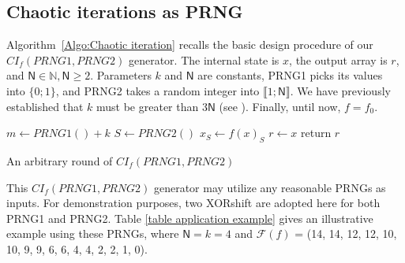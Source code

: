 \documentclass[conference]{IEEEtran}
\begin{document}
\subsection{Chaotic iterations as PRNG}
\label{subsec Chaotic iterations as PRNG}





Algorithm~\ref{Algo:Chaotic iteration} recalls the basic design procedure of our $CI_f(PRNG1,PRNG2)$ generator.
The internal state is $x$, the output array is $r$, and $\mathsf{N} \in \mathds{N}, \mathsf{N} \geqslant 2$. Parameters $k$ and $\mathsf{N}$ are constants, PRNG1 picks its values into $\{0;1\}$, and PRNG2 takes a random integer into $\llbracket 1;\mathsf{N} \rrbracket$.
We have previously established that $k$ must be greater than $3\mathsf{N}$ (see \cite{bgw09:ip}).
Finally, until now, $f = f_0$.

\begin{algorithm}
\SetAlgoLined
{}
$m\leftarrow{PRNG1()+k}$\;
{
$S\leftarrow{PRNG2()}$\;
$x_S\leftarrow{f(x)_S}$\;
}
$r\leftarrow{x}$\;
return $r$\;
\medskip
\caption{An arbitrary round of $CI_f(PRNG1,PRNG2)$}
\label{Algo:Chaotic iteration}
\end{algorithm}

This $CI_f(PRNG1,PRNG2)$ generator may utilize any reasonable PRNGs as inputs.
For demonstration purposes, two XORshift are adopted here for both
PRNG1 and PRNG2.
Table \ref{table application example} gives an illustrative example using these PRNGs,
where $\mathsf{N} = k = 4$ and $\mathcal{F}(f)$ = (14, 14,
12, 12, 10, 10, 9, 9, 6, 6, 4, 4, 2, 2, 1, 0).
\end{document}
